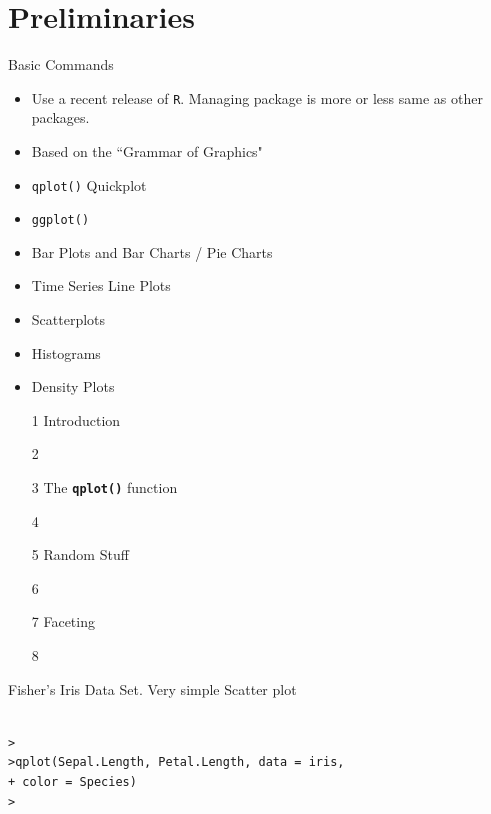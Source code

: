 

\section[Prelinaries]{Preliminaries}

\begin{frame}{\bf {}}
Basic Commands

\begin{itemize}\itemsep0.3cm
\item Use a recent release of \texttt{R}. Managing package is more or less same as other packages.
\item Based on the ``Grammar of Graphics"
\item \texttt{qplot()} Quickplot
\item \texttt{ggplot()}

\end{itemize}
\end{frame}
\begin{frame}{\bf {}}

\begin{itemize}\itemsep0.3cm
\item Bar Plots and Bar Charts / Pie Charts
\item Time Series Line Plots
\item Scatterplots
\item Histograms
\item Density Plots
\end{itemize}
\end{frame}

\begin{frame}{\bf {}}
\begin{itemize}\itemsep0.25cm
\item[1] Introduction
\item[2]
\item[3] The \textbf{\texttt{qplot()}} function
\item[4]
\item[5] Random Stuff
\item[6]
\item[7] Faceting
\item[8]
\end{itemize}
\end{frame}
\begin{frame}[fragile]{\bf {}}
Fisher's Iris Data Set. Very simple Scatter plot
\begin{verbatim}

>
>qplot(Sepal.Length, Petal.Length, data = iris,
+ color = Species)
>
\end{verbatim}
\end{frame}

